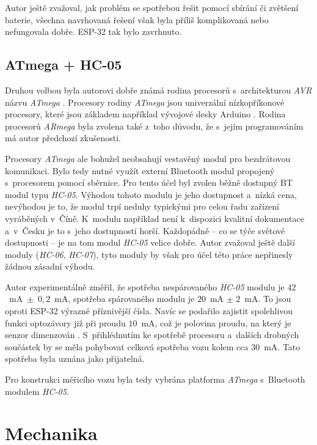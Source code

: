 Autor ještě zvažoval, jak problém se spotřebou řešit pomocí sbírání či
zvětšení baterie, všechna navrhovaná řešení však byla příliš komplikovaná nebo
nefungovala dobře. ESP-32 tak bylo zavrhnuto.

\subsection{ATmega + HC-05}
\label{subsec:wsm-atmega}

Druhou volbou byla autorovi dobře známá rodina procesorů s~architekturou
\textit{AVR} názvu \textit{ATmega} \cite{avr}. Procesory rodiny \textit{ATmega}
jsou univerzální nízkopříkonové procesory, které jsou základem například
vývojové desky Arduino \cite{arduino}. Rodina procesorů \textit{ARmega} byla
zvolena také z~toho důvodu, že s~jejím programováním má autor předchozí
zkušenosti.

Procesory \textit{ATmega} ale bohužel neobsahují vestavěný modul pro
bezdrátovou komunikaci. Bylo tedy nutné využít externí Bluetooth modul
propojený s~procesorem pomocí sběrnice. Pro tento účel byl zvolen
běžně dostupný BT modul typu \textit{HC-05}. Výhodou tohoto modulu je jeho
dostupnost a~nízká cena, nevýhodou je to, že modul trpí neduhy typickými pro
celou řadu zařízení vyráběných v~Číně. K~modulu například není k~dispozici
kvalitní dokumentace a~v~Česku je to s~jeho dostupností horší. Každopádně
-- co se týče světové dostupnosti -- je na tom modul \textit{HC-05} velice
dobře. Autor zvažoval ještě další moduly (\textit{HC-06}, \textit{HC-07}), tyto
moduly by však pro účel této práce nepřinesly žádnou zásadní výhodu.

Autor experimentálně změřil, že spotřeba nespárovaného \textit{HC-05} modulu je
$42$~mA~$\pm$~$0,2$~mA, spotřeba spárovaného modulu je $20$~mA $\pm$ $2$~mA. To
jsou oproti ESP-32 výrazně příznivější čísla. Navíc se podařilo zajistit
spolehlivou funkci optozávory již při proudu $10$~mA, což je polovina proudu,
na který je senzor dimenzován \cite{gp1s23:datasheet}. S~přihlédnutím ke
spotřebě procesoru a~dalších drobných součástek by se měla pohybovat celková
spotřeba vozu kolem cca $30$~mA. Tato spotřeba byla uznána jako přijatelná.

Pro konstrukci měřicího vozu byla tedy vybrána platforma \textit{ATmega}
s~Bluetooth modulem \textit{HC-05}.

\section{Mechanika}
\label{sec:wsm-mech}

